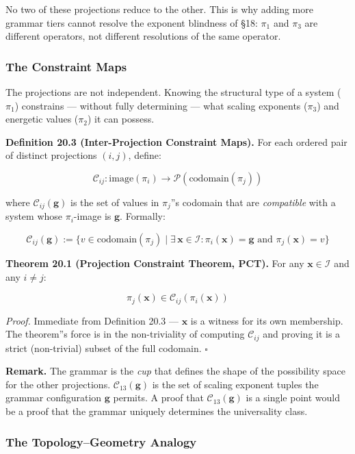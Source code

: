 \documentclass[12pt,a4paper]{article}
\newcommand{\pilcrow}{\S}
\begin{document}
No two of these projections reduce to the other. This is why adding more grammar tiers cannot resolve the exponent blindness of \pilcrow{}18: $\pi_1$ and $\pi_3$ are different operators, not different resolutions of the same operator.

\subsubsection{The Constraint Maps}

The projections are not independent. Knowing the structural type of a system ($\pi_1$) constrains --- without fully determining --- what scaling exponents ($\pi_3$) and energetic values ($\pi_2$) it can possess.

\textbf{Definition 20.3 (Inter-Projection Constraint Maps).} For each ordered pair of distinct projections $(i, j)$, define:

\[\mathcal{C}_{ij} : \mathrm{image}(\pi_i) \to \mathcal{P}(\mathrm{codomain}(\pi_j))\]

where $\mathcal{C}_{ij}(\mathbf{g})$ is the set of values in $\pi_j$''s codomain that are \emph{compatible} with a system whose $\pi_i$-image is $\mathbf{g}$. Formally:

\[\mathcal{C}_{ij}(\mathbf{g}) := \{ v \in \mathrm{codomain}(\pi_j) \mid \exists\, \mathbf{x} \in \mathcal{I} : \pi_i(\mathbf{x}) = \mathbf{g} \text{ and } \pi_j(\mathbf{x}) = v \}\]

\textbf{Theorem 20.1 (Projection Constraint Theorem, PCT).} For any $\mathbf{x} \in \mathcal{I}$ and any $i \neq j$:

\[\pi_j(\mathbf{x}) \in \mathcal{C}_{ij}(\pi_i(\mathbf{x}))\]

\emph{Proof.} Immediate from Definition 20.3 --- $\mathbf{x}$ is a witness for its own membership. The theorem''s force is in the non-triviality of computing $\mathcal{C}_{ij}$ and proving it is a strict (non-trivial) subset of the full codomain. $\square$

\textbf{Remark.} The grammar is the \emph{cup} that defines the shape of the possibility space for the other projections. $\mathcal{C}_{13}(\mathbf{g})$ is the set of scaling exponent tuples the grammar configuration $\mathbf{g}$ permits. A proof that $\mathcal{C}_{13}(\mathbf{g})$ is a single point would be a proof that the grammar uniquely determines the universality class.

\subsubsection{The Topology--Geometry Analogy}
\end{document}

